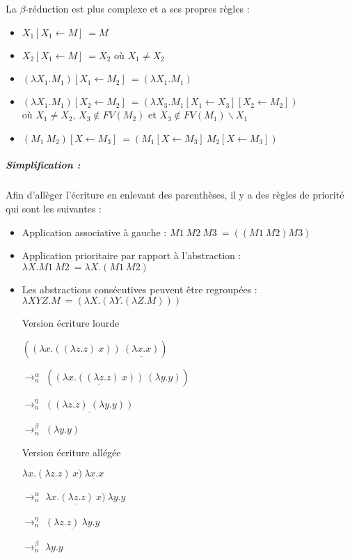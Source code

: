 \documentclass[10pt,a4paper]{article}
\begin{document}
				
				La $\beta$-réduction est plus complexe et a ses propres règles :
				\begin{itemize}
					\item $X_{1}[X_{1} \leftarrow M]~= M$
					\item $X_{2}[X_{1} \leftarrow M]~= X_{2}$ où $X_{1}\neq X_{2}$
					\item $(\lambda X_{1}.M_{1})[X_{1} \leftarrow M_{2}]~= (\lambda X_{1}.M_{1})$
					\item $(\lambda X_{1}.M_{1})[X_{2} \leftarrow M_{2}]~= (\lambda X_{3}.M_{1}[X_{1} \leftarrow X_{3}][X_{2} \leftarrow M_{2}])$ 
					\\où $X_{1} \neq X_{2}$, $X_{3} \notin FV(M_{2})$ et $X_{3} \notin FV(M_{1})\backslash{X_{1}}$ 
					\item $(M_{1}~M_{2})[X \leftarrow M_{3}]~=(M_{1}[X \leftarrow M_{3}]~M_{2}[X \leftarrow M_{3}])$
				\end{itemize}
				\bigbreak
			
			
				\subparagraph{Simplification :}Afin d'allèger l'écriture en enlevant des parenthèses, il y a des règles de priorité qui sont les suivantes :
				\begin{itemize}
					\item Application associative à gauche : $M1~M2~M3~= ((M1~M2)M3)$
					\item Application prioritaire par rapport à l'abstraction : $\lambda X.M1~M2~= \lambda X.(M1~M2)$
					\item Les abstractions consécutives peuvent être regroupées : $\lambda XYZ.M~= (\lambda X.(\lambda Y.(\lambda Z.M)))$
				\end{itemize}
				\medbreak
				
				\begin{multicols}{2}{
					\begin{itemize}
						\item[] Version écriture lourde
						\item[] $((\lambda x.((\lambda z.z)~x))~\underline{(\lambda x.x)})$
						\item[$\rightarrow_{n}^{\alpha}$] $(\underline{(\lambda x.((\lambda z.z)~x))}~(\lambda y.y))$
						\item[$\rightarrow_{n}^{\eta}$] $\underline{((\lambda z.z)~(\lambda y.y))}$
						\item[$\rightarrow_{n}^{\beta}$] $(\lambda y.y)$
					\end{itemize}
				
					\begin{itemize}
						\item[] Version écriture allégée
						\item[] $\lambda x.(\lambda z.z)~x)~\underline{\lambda x.x}$
						\item[$\rightarrow_{n}^{\alpha}$] $\underline{\lambda x.(\lambda z.z)~x)}~\lambda y.y$
						\item[$\rightarrow_{n}^{\eta}$] $\underline{(\lambda z.z)~\lambda y.y}$
						\item[$\rightarrow_{n}^{\beta}$] $\lambda y.y$
					\end{itemize}
				}
				\end{multicols}
				\bigbreak
				
\end{document}

